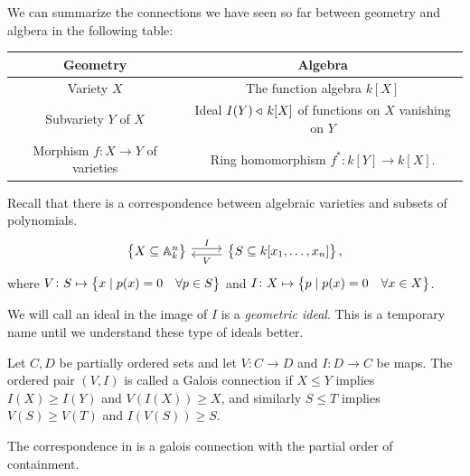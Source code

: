 \documentclass[11pt,a4paper]{article}
\newcommand{\A}{\mathbb A}
\begin{document}
\begin{remark}
  We can summarize the connections we have seen so far between geometry and
  algbera in the following table:
  \begin{center}
    \begin{tabular}{c|c}
    Geometry                        & Algebra        \\ \hline
    Variety $X$          & The function algebra $k[X]$ \\
    Subvariety $Y$ of $X$   & Ideal $I(Y) \triangleleft\, k[X]$ of functions on $X$ vanishing on $Y$         \\
    Morphism $f \colon X \to Y$ of varieties & Ring homomorphism $f^* \colon k[Y] \to k[X]$.     
    \end{tabular}
  \end{center}
\end{remark}

\begin{remark}
  \label{rmk:galois-connection}
  Recall that there is a correspondence between algebraic varieties
  and subsets of polynomials.
  \[
  \begin{tikzcd}
    \set{X \subseteq \A_k^n}
    \arrow[r, shift left, "I"] &
    \set{S \subseteq k[x_1,\dots,x_n]}
    \arrow[l, shift left, "V"],
  \end{tikzcd}
  \]
  where $V \colon S \mapsto \left\{x \mid p(x) = 0 \quad \forall p \in S\right\}$
  and $I \colon X \mapsto \left\{p \mid p(x) = 0 \quad \forall x \in X\right\}$.
\end{remark}

\begin{remark}
  We will call an ideal in the image of $I$ is a \textit{geometric ideal}.
  This is a temporary name until we understand these type of ideals better.
\end{remark}

\begin{definition}
  Let $C,D$ be partially ordered sets
  and let $V \colon C \to D$ and $I \colon D \to C$ be maps.
  The ordered pair $(V,I)$ is called a Galois connection if $X \le Y$
  implies $I(X) \geq I(Y)$ and $V(I(X)) \geq X$,
  and similarly $S \le T$ implies $V(S) \geq V(T)$ and $I(V(S)) \geq S$.
\end{definition}

\begin{remark}
  The correspondence in  is a galois connection
  with the partial order of containment.
\end{remark}
\end{document}
